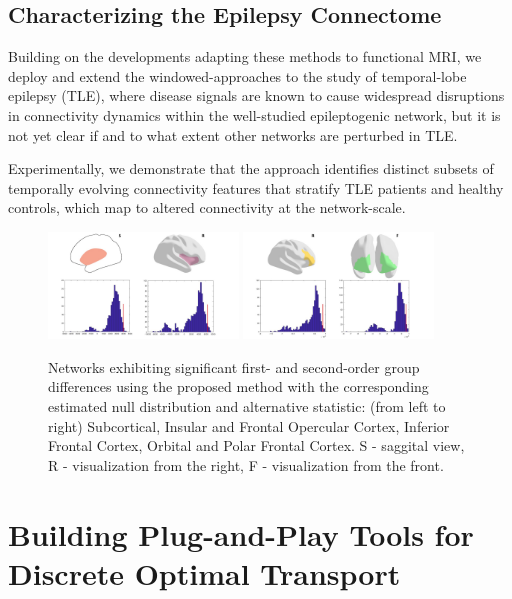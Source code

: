 \subsection{Characterizing the Epilepsy Connectome}
Building on the developments adapting these methods to functional MRI,
we deploy and extend the windowed-approaches
to the study of temporal-lobe epilepsy (TLE),
where disease signals are known to
cause widespread disruptions in connectivity dynamics within the well-studied epileptogenic network, 
but it is not yet clear if and to what extent other networks are perturbed in TLE.

Experimentally, we demonstrate that the approach identifies distinct subsets of temporally evolving connectivity features that stratify TLE patients and healthy controls, which map to altered connectivity at the network-scale. 

\begin{figure}
	\centering
	\includegraphics[width=0.45\textwidth, trim={2.5cm 0cm 3cm 0cm}]{7_conclude/figs/ProposedMethod_Results1.jpg}
	\includegraphics[width=0.45\textwidth, trim={2.5cm 0cm 4cm 0cm},clip]{7_conclude/figs/ProposedMethod_Results2.jpg}
	\caption[Differences in network connectivities in TLE populations]{Networks exhibiting significant first- and second-order group differences using the proposed method with the corresponding estimated null distribution and alternative statistic: (from left to right) Subcortical, Insular and Frontal Opercular Cortex, Inferior Frontal Cortex, Orbital and Polar Frontal Cortex. S - saggital view, R - visualization from the right, F - visualization from the front. \label{fig:CovTrajResults}}
\end{figure}

\section{Building Plug-and-Play Tools for Discrete Optimal Transport}

